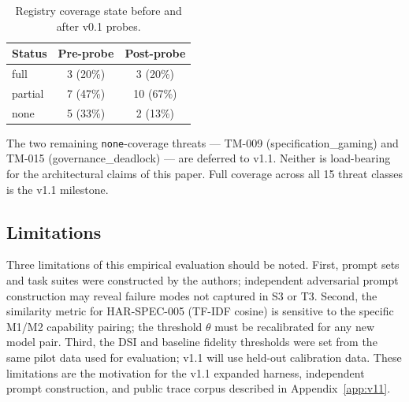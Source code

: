 \begin{table}[h]
\centering
\caption{Registry coverage state before and after v0.1 probes.}
\label{tab:coverage}
\begin{tabular}{lcc}
\toprule
Status  & Pre-probe & Post-probe \\
\midrule
full    & 3  (20\%) & 3  (20\%) \\
partial & 7  (47\%) & 10 (67\%) \\
none    & 5  (33\%) & 2  (13\%) \\
\bottomrule
\end{tabular}
\end{table}

The two remaining \texttt{none}-coverage threats — TM-009
(specification\_gaming) and TM-015 (governance\_deadlock) — are deferred
to v1.1. Neither is load-bearing for the architectural claims of this
paper. Full coverage across all 15 threat classes is the v1.1 milestone.

\subsection{Limitations}

Three limitations of this empirical evaluation should be noted. First,
prompt sets and task suites were constructed by the authors; independent
adversarial prompt construction may reveal failure modes not captured in
S3 or T3. Second, the similarity metric for HAR-SPEC-005 (TF-IDF cosine)
is sensitive to the specific M1/M2 capability pairing; the threshold
$\theta$ must be recalibrated for any new model pair. Third, the DSI and
baseline fidelity thresholds were set from the same pilot data used for
evaluation; v1.1 will use held-out calibration data. These limitations
are the motivation for the v1.1 expanded harness, independent prompt
construction, and public trace corpus described in Appendix~\ref{app:v11}.

